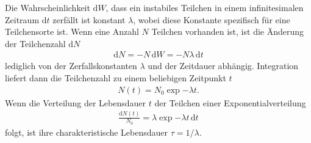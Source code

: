 Die Wahrscheinlichkeit $\text{d}W$, dass ein instabiles Teilchen in einem infinitesimalen Zeitraum $\text{d}t$ zerfällt ist konstant $\lambda$, wobei diese Konstante spezifisch für eine Teilchensorte ist. Wenn eine Anzahl $N$ Teilchen vorhanden ist, ist die Änderung der Teilchenzahl $\text{d}N$
\begin{align}
	\text{d}N = -N\,\text{d}W = -N\lambda\,\text{d}t
\end{align}
lediglich von der Zerfallskonstanten $\lambda$ und der Zeitdauer abhängig. Integration liefert dann die Teilchenzahl zu einem beliebigen Zeitpunkt $t$
\begin{align}
	N(t) = N_0 \exp{-\lambda t}.
\end{align}
Wenn die Verteilung der Lebensdauer $t$ der Teilchen einer Exponentialverteilung
\begin{align}
	\frac{\text{d}N(t)}{N_0} = \lambda \exp{-\lambda t}\,\text{d}t
\end{align}
folgt, ist ihre charakteristische Lebensdauer $\tau = 1/\lambda$.
